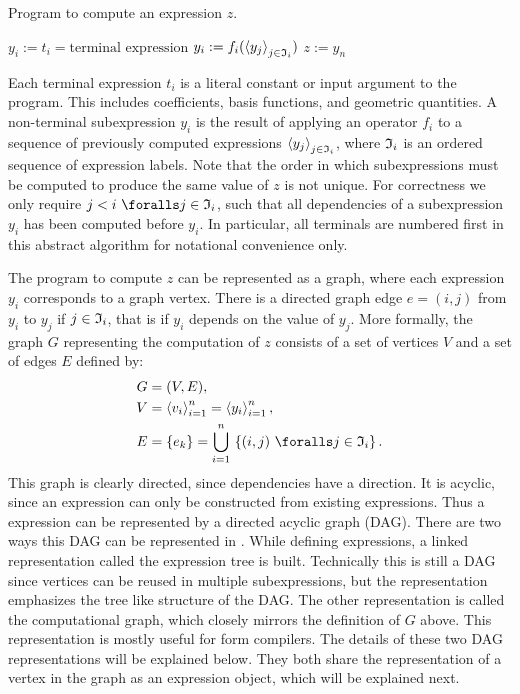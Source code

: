 \begin{algorithm}[!b]
\caption{Program to compute an expression $z$.}
\label{ufl:alg:program}
\begin{algorithmic}[1]
\State $y_i :=  t_i = \mbox{terminal expression}$
\EndFor
{}
\State $y_i :=  f_i(\left\langle{y_j}\right\rangle_{j\in\mathfrak{I}_i})$
\EndFor
\State $z := y_n$
\end{algorithmic}
\end{algorithm}

Each terminal expression $t_i$ is a literal constant or input argument to
the program. This includes coefficients, basis functions, and geometric
quantities.  A non-terminal subexpression $y_i$ is the result of applying
an operator $f_i$ to a sequence of previously computed expressions
$\left\langle{y_j}\right\rangle_{j\in\mathfrak{I}_i}$, where $\mathfrak{I}_i$ is an ordered sequence of
expression labels.  Note that the order in which subexpressions
must be computed to produce the same value of $z$ is not unique.
For correctness we only require $j < i \,\, \foralls j \in \mI_i$,
such that all dependencies of a subexpression $y_i$ has been computed
before $y_i$.  In particular, all terminals are numbered first in this
abstract algorithm for notational convenience only.

The program to compute $z$ can be represented as a graph, where each
expression $y_i$ corresponds to a graph vertex. There is a directed
graph edge $e = (i, j)$ from $y_i$ to $y_j$ if $j \in \mathfrak{I}_i$, that is
if $y_i$ depends on the value of $y_j$. More formally, the graph $G$
representing the computation of $z$ consists of a set of vertices $V$
and a set of edges $E$ defined by:\vspace*{-2.5pt}
\begin{align}
G &= (V, E), \label{ufl:eq:G} \\
V &= \seq{v_i}_{i=1}^n = \seq{y_i}_{i=1}^n, \label{ufl:eq:V} \\
E &= \{ e_k \} = \bigcup_{i=1}^n \, \left\{ (i, j) \,\, \foralls j \in \mI_i \right\} . \label{ufl:eq:E}\vspace*{-2.5pt}
\end{align}
This graph is clearly directed, since dependencies have a direction.
It is acyclic, since an expression can only be constructed from existing
expressions.  Thus a \ufl{} expression can be represented by a directed
acyclic graph (DAG).  There are two ways this DAG can be represented
in \ufl{}. While defining expressions, a linked representation called
the expression tree is built. Technically this is still a DAG since
vertices can be reused in multiple subexpressions, but the representation
emphasizes the tree like structure of the DAG. The other representation
is called the computational graph, which closely mirrors the definition
of $G$ above. This representation is mostly useful for form compilers.
The details of these two DAG representations will be explained below.
They both share the representation of a vertex in the graph as an
expression object, which will be explained next.


